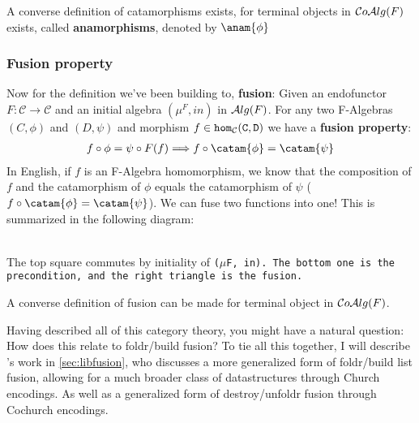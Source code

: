 A converse definition of catamorphisms exists, for terminal objects in $\mathcal{C}o\mathcal{A}lg(F)$ exists, called \textbf{anamorphisms}, denoted by $\anam{\phi}$

\subsubsection{Fusion property}\label{sec:fusion_prop}
Now for the definition we've been building to, \textbf{fusion}:
Given an endofunctor $F:\mathcal{C}\to\mathcal{C}$ and an initial algebra $(\mu^F,in)$ in $\mathcal{A}lg(F)$. For any two F-Algebras $(C,\phi)$ and $(D,\psi)$ and morphism $f\in\tt{hom}_\mathcal{C}(C,D)$ we have a \textbf{fusion property}: \begin{align*} f\circ\phi=\psi\circ F(f) \Longrightarrow f\circ\catam{\phi}=\catam{\psi} \end{align*}
In English, if $f$ is an F-Algebra homomorphism, we know that the composition of $f$ and the catamorphism of $\phi$ equals the catamorphism of $\psi$ ($f\circ\catam{\phi}=\catam{\psi}$). We can fuse two functions into one! This is summarized in the following diagram:
\begin{figure}[H]\vspace{-1em}\hfill
{}\hfill\null
\end{figure}\vspace{-2em}~\\
The top square commutes by initiality of \tt{($\mu$F, in)}. The bottom one is the precondition, and the right triangle is the fusion.

A converse definition of fusion can be made for terminal object in $\mathcal{C}o\mathcal{A}lg(F)$.

Having described all of this category theory, you might have a natural question: How does this relate to foldr/build fusion?
To tie all this together, I will describe \cite{Harper2011}'s work in \autoref{sec:libfusion}, who discusses a more generalized form of foldr/build list fusion, allowing for a much broader class of datastructures through Church encodings. As well as a generalized form of destroy/unfoldr fusion through Cochurch encodings.

